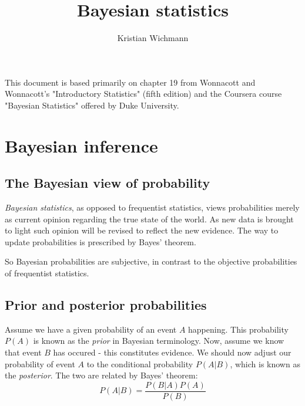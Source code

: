 \documentclass[12pt, a4paper]{article}
\title{Bayesian statistics}
\author{Kristian Wichmann}
\begin{document}
\maketitle

This document is based primarily on chapter 19 from Wonnacott and Wonnacott's "Introductory Statistics" (fifth edition) and the Coursera course "Bayesian Statistics" offered by Duke University.

\section{Bayesian inference}

\subsection{The Bayesian view of probability}

\textit{Bayesian statistics}, as opposed to frequentist statistics, views probabilities merely as current opinion regarding the true state of the world. As new data is brought to light such opinion will be revised to reflect the new evidence. The way to update probabilities is prescribed by Bayes' theorem.\par
So Bayesian probabilities are subjective, in contrast to the objective probabilities of frequentist statistics.

\subsection{Prior and posterior probabilities}
Assume we have a given probability of an event $A$ happening. This probability $P(A)$ is known as the \textit{prior} in Bayesian terminology. Now, assume we know that event $B$ has occured - this constitutes evidence. We should now adjust our probability of event $A$ to the conditional probability $P(A|B)$, which is known as the \textit{posterior}. The two are related by Bayes' theorem:
\begin{equation}
\label{bayes}
P(A|B)=\frac{P(B|A)P(A)}{P(B)}
\end{equation}
\end{document}
